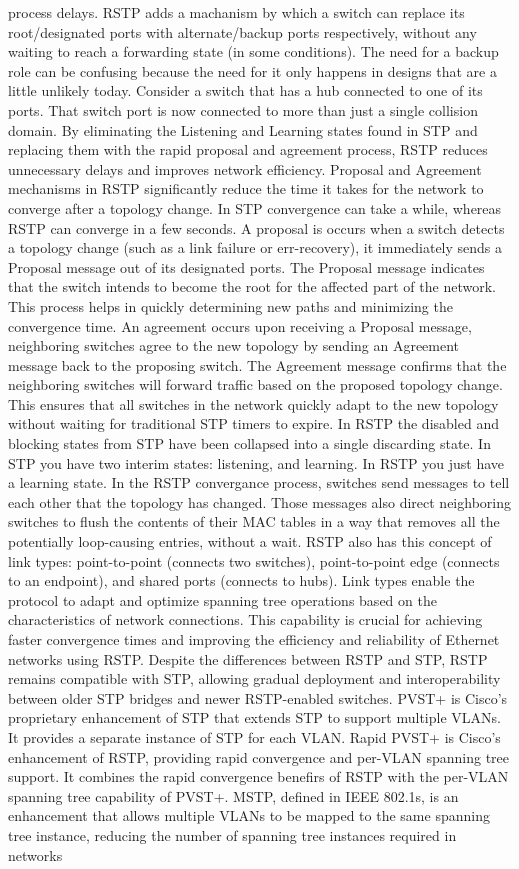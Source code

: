 \documentclass{article}
\begin{document}
process delays. RSTP adds a machanism by which a switch can replace its root/designated ports with alternate/backup ports respectively, without any waiting to reach a forwarding state (in some conditions). The need for a backup role can be confusing because the need for it only happens in designs that are a little unlikely today. Consider a switch that has a hub connected to one of its ports. That switch port is now connected to more than just a single collision domain. By eliminating the Listening and Learning states found in STP and replacing them with the rapid proposal and agreement process, RSTP reduces unnecessary delays and improves network efficiency. Proposal and Agreement mechanisms in RSTP significantly reduce the time it takes for the network to converge after a topology change. In STP convergence can take a while, whereas RSTP can converge in a few seconds. A proposal is occurs when a switch detects a topology change (such as a link failure or err-recovery), it immediately sends a Proposal message out of its designated ports. The Proposal message indicates that the switch intends to become the root for the affected part of the network. This process helps in quickly determining new paths and minimizing the convergence time. An agreement occurs upon receiving a Proposal message, neighboring switches agree to the new topology by sending an Agreement message back to the proposing switch. The Agreement message confirms that the neighboring switches will forward traffic based on the proposed topology change. This ensures that all switches in the network quickly adapt to the new topology without waiting for traditional STP timers to expire. In RSTP the disabled and blocking states from STP have been collapsed into a single discarding state. In STP you have two interim states: listening, and learning. In RSTP you just have a learning state. In the RSTP convergance process, switches send messages to tell each other that the topology has changed. Those messages also direct neighboring switches to flush the contents of their MAC tables in a way that removes all the potentially loop-causing entries, without a wait. RSTP also has this concept of link types: point-to-point (connects two switches), point-to-point edge (connects to an endpoint), and shared ports (connects to hubs). Link types enable the protocol to adapt and optimize spanning tree operations based on the characteristics of network connections. This capability is crucial for achieving faster convergence times and improving the efficiency and reliability of Ethernet networks using RSTP. Despite the differences between RSTP and STP, RSTP remains compatible with STP, allowing gradual deployment and interoperability between older STP bridges and newer RSTP-enabled switches. PVST+ is Cisco's proprietary enhancement of STP that extends STP to support multiple VLANs. It provides a separate instance of STP for each VLAN. Rapid PVST+ is Cisco's enhancement of RSTP, providing rapid convergence and per-VLAN spanning tree support. It combines the rapid convergence benefirs of RSTP with the per-VLAN spanning tree capability of PVST+. MSTP, defined in IEEE 802.1s, is an enhancement that allows multiple VLANs to be mapped to the same spanning tree instance, reducing the number of spanning tree instances required in networks 
\end{document}

